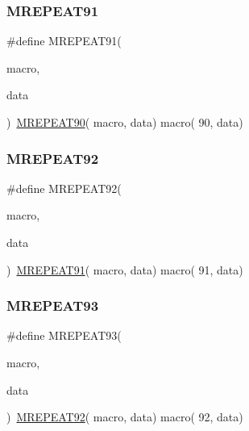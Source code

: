\mbox{\label{group__group__sam0__utils__mrepeat_ga34182f160702d4e1b896298efc7eaaac}} 
\subsubsection{\texorpdfstring{MREPEAT91}{MREPEAT91}}
{\footnotesize\ttfamily \#define M\+R\+E\+P\+E\+A\+T91(\begin{DoxyParamCaption}\item[{}]{macro,  }\item[{}]{data }\end{DoxyParamCaption})~\mbox{\hyperlink{group__group__sam0__utils__mrepeat_gae85d4d27c3fbd9b354f04156111d089d}{M\+R\+E\+P\+E\+A\+T90}}( macro, data)   macro( 90, data)}

\mbox{\label{group__group__sam0__utils__mrepeat_gad0cb974b5c2b9677a0127be09057faaf}} 
\subsubsection{\texorpdfstring{MREPEAT92}{MREPEAT92}}
{\footnotesize\ttfamily \#define M\+R\+E\+P\+E\+A\+T92(\begin{DoxyParamCaption}\item[{}]{macro,  }\item[{}]{data }\end{DoxyParamCaption})~\mbox{\hyperlink{group__group__sam0__utils__mrepeat_ga34182f160702d4e1b896298efc7eaaac}{M\+R\+E\+P\+E\+A\+T91}}( macro, data)   macro( 91, data)}

\mbox{\label{group__group__sam0__utils__mrepeat_gaa8143ea25cb446fb9e5afa4f79a7fbd8}} 
\subsubsection{\texorpdfstring{MREPEAT93}{MREPEAT93}}
{\footnotesize\ttfamily \#define M\+R\+E\+P\+E\+A\+T93(\begin{DoxyParamCaption}\item[{}]{macro,  }\item[{}]{data }\end{DoxyParamCaption})~\mbox{\hyperlink{group__group__sam0__utils__mrepeat_gad0cb974b5c2b9677a0127be09057faaf}{M\+R\+E\+P\+E\+A\+T92}}( macro, data)   macro( 92, data)}

